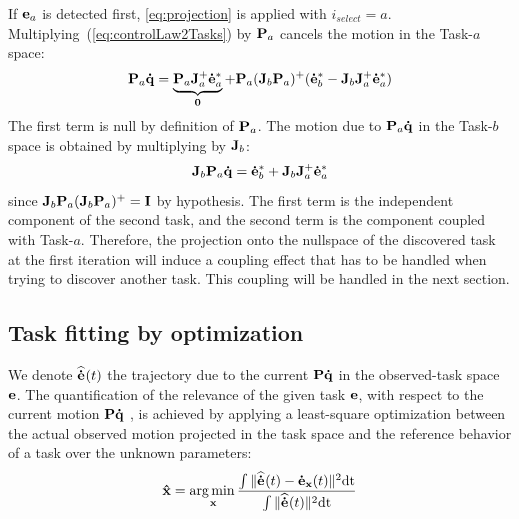 \documentclass[letterpaper, 10pt, conference]{ieeeconf}      %
\begin{document}
If ${\mathbf{e}}_a$ is detected first, \eqref{eq:projection} is applied with
$i_{select} = a$. Multiplying~(\ref{eq:controlLaw2Tasks}) by ${\mathbf{P}}_a$
cancels the motion in the Task-$a$ space:
\begin{equation}
  {\mathbf{P}}_a {\mathbf{\dot{q}}} = \underbrace{{\mathbf{P}}_a {\mathbf{J}}_a^+{\mathbf{\dot{e}}}_a^*}_{{\mathbf{0}}} + {\mathbf{P}}_a ({\mathbf{J}}_b{\mathbf{P}}_a)^+ ({\mathbf{\dot{e}}}_b^* - {\mathbf{J}}_b{\mathbf{J}}_a^+{\mathbf{\dot{e}}}_a^*)  
  \label{eq:cancel1_2:1}
\end{equation}
The first term is null by definition of ${\mathbf{P}}_a$.
The motion due to ${\mathbf{P}}_a {\mathbf{\dot{q}}}$ in the Task-$b$ space is obtained by multiplying by ${\mathbf{J}}_b$:
\begin{equation}
  {\mathbf{J}}_b {\mathbf{P}}_a {\mathbf{\dot{q}}} = {\mathbf{\dot{e}}}_b^* +
  {\mathbf{J}}_b  {\mathbf{J}}_a^+ {\mathbf{\dot{e}}}_a^*  
  \label{eq:J2P1q}
\end{equation}
since ${\mathbf{J}}_b{\mathbf{P}}_a({\mathbf{J}}_b{\mathbf{P}}_a)^+ = {\mathbf{I}}$ by hypothesis.
The first term is the
independent component of the second task, and the second term
is the component coupled with Task-$a$. 
Therefore, the projection onto the nullspace of the discovered task  at the 
first iteration will induce a coupling effect that has to be handled when trying to discover another task.
This coupling will be handled in the next section.


\newcommand{\medot}[1]{\mbf{\dot{e}}_{#1}}
\newcommand{\mqdot}{\mbf{\dot{q}}}
\newcommand{\mP}[1]{\mbf{P}_{#1}}
\newcommand{\mJ}[1]{\mbf{J}_{#1}}
\newcommand{\mJp}[1]{\mbf{J}_{#1}^+}
\newcommand{\medotc}[1]{\medot{#1}^*}
\newcommand{\medoth}[1]{\mbf{\widehat{\dot{e}}}_{#1}}
\newcommand{\medothp}[2]{\medoth{#1|#2}}

\subsection{Task fitting by optimization} \label{sec:alg2:proj}
We denote $\medoth{}(t)$ the trajectory due to the current ${\mathbf{P}}
{\mathbf{\dot{q}}}$ in the observed-task space ${\mathbf{e}}$.  The quantification of the
relevance of the given task ${\mathbf{e}}$, with respect to the current motion
${\mathbf{P}} {\mathbf{\dot{q}}}$ , is achieved by applying a least-square
optimization between the actual observed motion projected in the task space and
the reference behavior of a task over the unknown parameters:
\begin{equation}
  \mbf{\hat x} = \underset{\mbf{x}}\argmin \frac{\int \Vert \medoth{}(t) - \medot{\mbf x}(t) \Vert^2 \mathrm{dt}}{\int \Vert \medoth{}(t) \Vert^2 \mathrm{dt}}
\label{optimProblem}
\end{equation}
\end{document}
